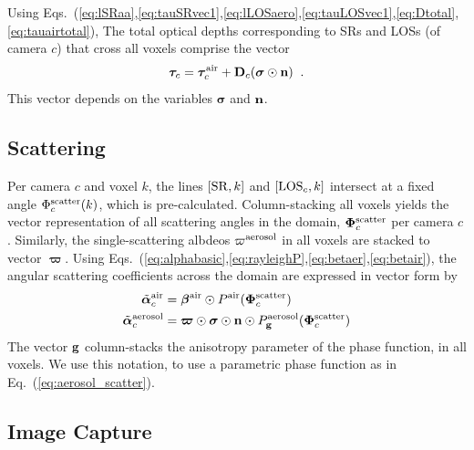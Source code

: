 \documentclass[10pt,twocolumn,letterpaper]{article}
\newcommand{\vect}[1]{\bm{#1}}
\begin{document}
Using Eqs.~(\ref{eq:lSRaa},\ref{eq:tauSRvec1},\ref{eq:lLOSaero},\ref{eq:tauLOSvec1},\ref{eq:Dtotal},\ref{eq:tauairtotal}),
The total optical depths corresponding to SRs and LOSs (of camera $c$) that cross all voxels comprise the vector
\begin{equation}
  \vect{\tau}_c= \vect{\tau}_c^{\rm air}
               + {\bf D}_c (\vect{\sigma} \odot {\bf n})
  \;\;.
  \label{eq:tautotal}
\end{equation}
This vector depends on the variables $\vect{\sigma}$ and ${\bf n}$.

\subsection{Scattering}
\label{sec:scattering}

Per camera $c$ and voxel $k$, the lines $[{\rm SR},k]$ and $[{\rm LOS}_c,k]$ intersect at a
fixed angle $\Phi^{\rm scatter}_c(k)$, which is pre-calculated.
Column-stacking all voxels yields the vector representation of all scattering angles in the domain, $\vect{\Phi}^{\rm scatter}_c$ per camera $c$. Similarly, the single-scattering albdeos
$\varpi^{\rm aerosol}$ in all voxels are stacked to vector $\vect{\varpi}$.
Using Eqs.~(\ref{eq:alphabasic},\ref{eq:rayleighP},\ref{eq:betaer},\ref{eq:betair}), the angular scattering coefficients across the domain are expressed in vector form by
\begin{align}
  \tilde{\vect{\alpha}}^{\rm air}_c &=
    \vect{\beta}^{\rm air} \odot P^{\rm air}(\vect{\Phi}^{\rm scatter}_c)   \nonumber \\
  \tilde{\vect{\alpha}}^{\rm aerosol}_c &=
     \vect{\varpi}\odot
     \vect{\sigma} \odot
     {\bf n} \odot
     P^{\rm aerosol}_{\bf g}(\vect{\Phi}^{\rm scatter}_c)
  \label{eq:alpha_matrix}
\end{align}
The vector ${\bf g}$ column-stacks the anisotropy parameter of the phase function, in all voxels. We use this notation, to use a parametric phase function as in Eq.~(\ref{eq:aerosol_scatter}).


\subsection{Image Capture}
\label{sec:captured-image}
\end{document}
